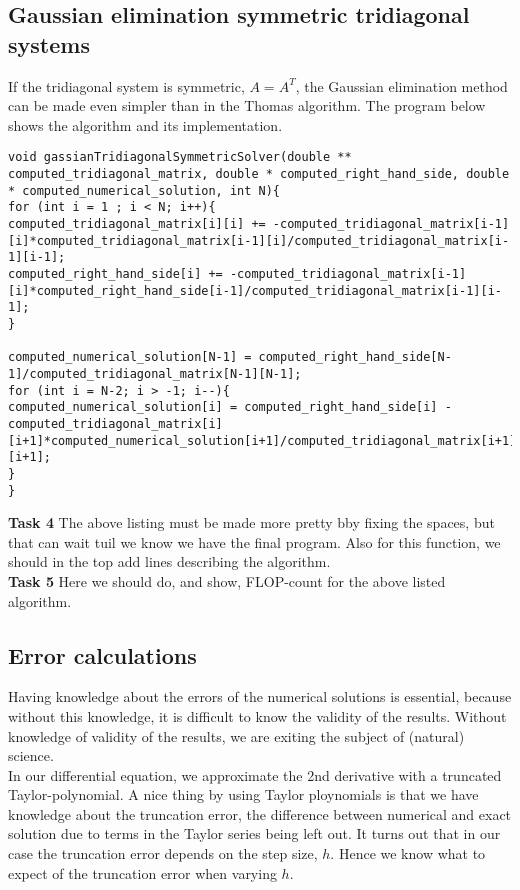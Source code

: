 \documentclass{article}
\begin{document}
\subsection{Gaussian elimination symmetric tridiagonal systems}
If the tridiagonal system is symmetric, $A = A^T$, the Gaussian elimination method can be made even simpler than in the Thomas algorithm. The program below shows the algorithm and its implementation.

\begin{lstlisting}
void gassianTridiagonalSymmetricSolver(double ** computed_tridiagonal_matrix, double * computed_right_hand_side, double * computed_numerical_solution, int N){
for (int i = 1 ; i < N; i++){
computed_tridiagonal_matrix[i][i] += -computed_tridiagonal_matrix[i-1][i]*computed_tridiagonal_matrix[i-1][i]/computed_tridiagonal_matrix[i-1][i-1];
computed_right_hand_side[i] += -computed_tridiagonal_matrix[i-1][i]*computed_right_hand_side[i-1]/computed_tridiagonal_matrix[i-1][i-1];
}

computed_numerical_solution[N-1] = computed_right_hand_side[N-1]/computed_tridiagonal_matrix[N-1][N-1];
for (int i = N-2; i > -1; i--){
computed_numerical_solution[i] = computed_right_hand_side[i] - computed_tridiagonal_matrix[i][i+1]*computed_numerical_solution[i+1]/computed_tridiagonal_matrix[i+1][i+1];
}
}
\end{lstlisting}

\textbf{Task 4} The above listing must be made more pretty bby fixing the spaces, but that can wait tuil we know we have the final program. Also for this function, we should in the top add lines describing the algorithm.\\

\textbf{Task 5} Here we should do, and show, FLOP-count for the above listed algorithm.

\subsection{Error calculations}
Having knowledge about the errors of the numerical solutions is essential, because without this knowledge, it is difficult to know the validity of the results. Without knowledge of validity of the results, we are exiting the subject of (natural) science. \\

In our differential equation, we approximate the 2nd derivative with a truncated Taylor-polynomial. A nice thing by using Taylor ploynomials is that we have knowledge about the truncation error, the difference between numerical and exact solution due to terms in the Taylor series being left out. It turns out that in our case the truncation error depends on the step size, $h$. Hence we know what to expect of the truncation error when varying $h$. \\
\end{document}
